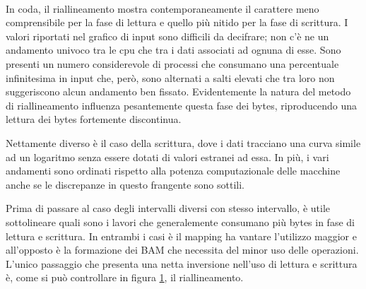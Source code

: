 \begin{figure}[H]
\centering
{} \quad
{} \\
\caption{}
\label{fig:IOR}
\end{figure}

In coda, il riallineamento mostra contemporaneamente il carattere meno comprensibile per la fase di lettura e quello più nitido per la fase di scrittura.
I valori riportati nel grafico di input sono difficili da decifrare; non c'è ne un andamento univoco tra le cpu che tra i dati associati ad ognuna di esse.
Sono presenti un numero considerevole di processi che consumano una percentuale infinitesima in input che, però, sono alternati a salti elevati che tra loro non suggeriscono alcun andamento ben fissato.
Evidentemente la natura del metodo di riallineamento influenza pesantemente questa fase dei bytes, riproducendo una lettura dei bytes fortemente discontinua.

Nettamente diverso è il caso della scrittura, dove i dati tracciano una curva simile ad un logaritmo senza essere dotati di valori estranei ad essa.
In più, i vari andamenti sono ordinati rispetto alla potenza computazionale delle macchine anche se le discrepanze in questo frangente sono sottili.

\par Prima di passare al caso degli intervalli diversi con stesso intervallo, è utile sottolineare quali sono i lavori che generalemente consumano più bytes in fase di lettura e scrittura.
In entrambi i casi è il mapping ha vantare l'utilizzo maggior e all'opposto è la formazione dei BAM che necessita del minor uso delle operazioni. 
L'unico passaggio che presenta una netta inversione nell'uso di lettura e scrittura è, come si può controllare in figura \ref{fig:IOR}, il riallineamento.

